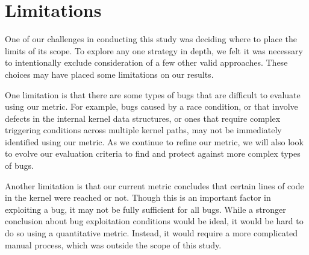 \section{Limitations}
\label{sec.limitation}

One of our challenges in conducting this study was deciding where to place the
limits of its scope. To explore any one strategy
in depth, we felt it was necessary to intentionally exclude consideration of
a few other valid approaches. These choices may have placed some limitations on our results.

One limitation is that there are some types of bugs that are difficult to evaluate using our metric.
For example, bugs caused by a race condition, or that involve defects in the internal kernel data
structures, or ones that require complex triggering conditions across multiple kernel
paths, may not be immediately identified using our metric. As we continue to refine our metric,
we will also look to evolve our evaluation criteria to find and protect against more complex types of bugs.

Another limitation is that our current metric concludes that certain lines of
code in the kernel were reached or not.
Though this is an important factor in exploiting a bug, it may not be fully
sufficient for all bugs.
While a stronger conclusion about bug exploitation conditions would be ideal,
it would be hard to do so using a quantitative metric.
Instead, it would require a more complicated manual process, which was outside
the scope of this study.
